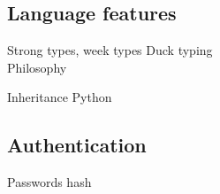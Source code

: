 \documentclass{beamer}
\begin{document}
\begin{CJK*}{UTF8}{bsmi}
    \subsection{Language features}
    \begin{frame}{Strong types, week types}
        Duck typing\\
        Philosophy
    \end{frame}

    \begin{frame}{Inheritance}
        Python
    \end{frame}

    \subsection{Authentication}
    \begin{frame}{Passwords}
        hash
    \end{frame}


\end{CJK*}
\end{document}
